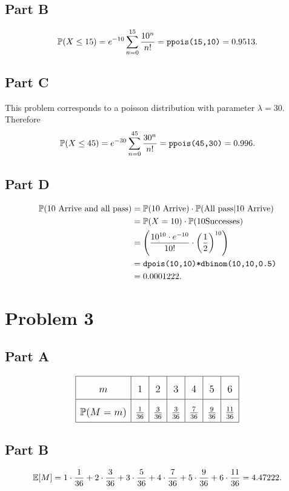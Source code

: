 \documentclass[12pt]{extarticle}
\begin{document}
\subsection*{Part B}
\[
	\Prob{X \leq 15} = e^{-10} \sum_{n=0}^{15} \frac{10^n}{n!} = \verb|ppois(15,10)| = 0.9513
.\]

\subsection*{Part C}
This problem corresponds to a poisson distribution with parameter $\lambda = 30$. Therefore
\[
	\Prob{X \leq 45} = e^{-30} \sum_{n=0}^{45} \frac{30^n}{n!} = \verb|ppois(45,30)| = 0.996
.\]

\subsection*{Part D}
\begin{align*}
	\mathbb{P}\qty(\text{10 Arrive and all pass}) &= \mathbb{P}\qty(\text{10 Arrive})\cdot\mathbb{P}\qty(\text{All pass} | \text{10 Arrive}) \\
																			 &= \mathbb{P}\qty(X = 10)\cdot\mathbb{P}\qty(10 \text{Successes}) \\
																			 &= \qty(\frac{10^{10} \cdot e^{-10}}{10!} \cdot \qty(\frac{1}{2})^{10}) \\
																			 &= \texttt{dpois(10,10)*dbinom(10,10,0.5)} \\
																			 &= 0.0001222
.\end{align*}

\section*{Problem 3}
\subsection*{Part A}
\[
	\renewcommand\arraystretch{1.9}
	\large
	\begin{array}{|c|c|c|c|c|c|c|} \hline
		m & 1 & 2 & 3 & 4 & 5 & 6 \\\hline
		\Prob{M = m} & \frac{1}{36} & \frac{3}{36} & \frac{3}{36} & \frac{7}{36} & \frac{9}{36} & \frac{11}{36}   \\\hline
	\end{array}
\]

\subsection*{Part B}
\[
	\mathbb{E}\qty[M] = 1\cdot\frac{1}{36} + 2\cdot\frac{3}{36} + 3\cdot\frac{5}{36} + 4\cdot\frac{7}{36} + 5\cdot\frac{9}{36} + 6\cdot\frac{11}{36} = 4.47222
.\]
\end{document}
